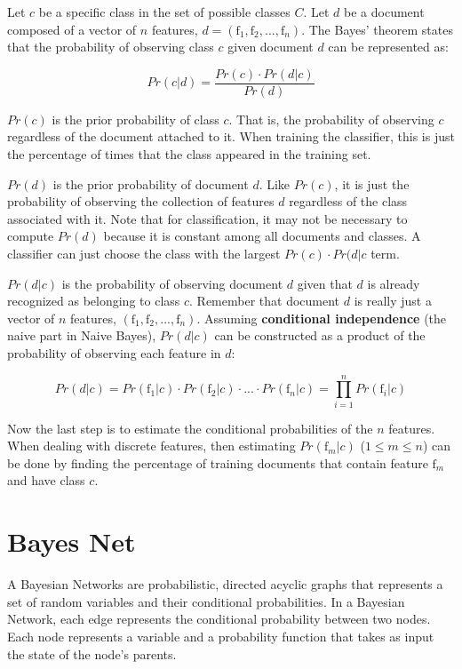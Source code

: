 \documentclass[12pt]{ucthesis}
\begin{document}
Let $c$ be a specific class in the set of possible classes $C$.
Let $d$ be a document composed of a vector of $n$ features, $d = (\textrm{f}_{1}, \textrm{f}_{2}, ..., \textrm{f}_{n})$.
The Bayes' theorem states that the probability of observing class $c$ given document $d$
can be represented as:

\begin{equation}
   Pr(c|d) = \frac{Pr(c) \cdot Pr(d|c)}{Pr(d)}
\end{equation}

$Pr(c)$ is the \textsf{prior probability} of class $c$. That is, the probability of
observing $c$ regardless of the document attached to it. When training the classifier, this
is just the percentage of times that the class appeared in the training set.

$Pr(d)$ is the \textsf{prior probability} of document $d$. Like $Pr(c)$, it is just the
probability of observing the collection of features $d$ regardless of the class associated with it.
Note that for classification, it may not be necessary to compute $Pr(d)$ because it is constant among all
documents and classes. A classifier can just choose the class with the largest $Pr(c) \cdot Pr(d|c$ term.

$Pr(d|c)$ is the probability of observing document $d$ given that $d$ is already recognized as belonging to
class $c$. Remember that document $d$ is really just a vector of $n$ features, $(\textrm{f}_{1}, \textrm{f}_{2}, ..., \textrm{f}_{n})$.
Assuming \textbf{conditional independence} (the \textsf{naive} part in Naive Bayes), $Pr(d|c)$ can be
constructed as a product of the probability of observing each feature in $d$:

\begin{equation}
   Pr(d|c) = Pr(\textrm{f}_{1}|c) \cdot Pr(\textrm{f}_{2}|c) \cdot ... \cdot Pr(\textrm{f}_{n}|c) = \prod_{i = 1}^{n}Pr(\textrm{f}_{i}|c)
\end{equation}

Now the last step is to estimate the conditional probabilities of the $n$ features.
When dealing with discrete features, then estimating $Pr(\textrm{f}_{m}|c)$ ($1 \leq m \leq n$) can be done by
finding the percentage of training documents that contain feature $\textrm{f}_{m}$ and have class $c$.

\section{Bayes Net}
\label{background-classification-classifiers-bayes-net}
A Bayesian Networks are probabilistic, directed acyclic graphs that represents a set of random variables and their conditional probabilities.
In a Bayesian Network, each edge represents the conditional probability between two nodes. Each node represents a variable and a probability
function that takes as input the state of the node's parents.\cite{Pearl}\cite{Neapolitan}
\end{document}
